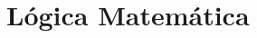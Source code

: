 \documentclass[../../main]{subfiles}
\begin{document}
\chapter{Lógica Matemática}
\label{chap:matematica:logica-matematica}

\newpage

\newpage

\newpage

\newpage

\end{document}

